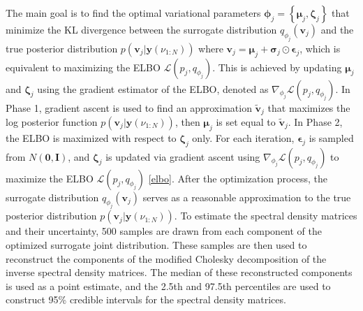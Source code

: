\documentclass[12pt,a4paper]{article}
\begin{document}
The main goal is to find the optimal variational parameters $\bm{\phi}_j = \left\{\bm{\mu}_j, \bm{\zeta}_j \right\}$ that minimize the KL divergence between the surrogate distribution $q_{\phi_j}(\mathbf{v}_j)$ and the true posterior distribution $p(\mathbf{v}_j|\mathbf{y}(\nu_{1:N}))$ where $\mathbf{v}_j = \bm{\mu}_j+ \bm{\sigma}_j \odot \bm{\epsilon}_j$, which is equivalent to maximizing the ELBO $\mathcal{L}(p_j,q_{\phi_j})$. This is achieved by updating $\bm{\mu}_j$ and $\bm{\zeta}_j$ using the gradient estimator of the ELBO, denoted as $\nabla_{\phi_j} \mathcal{L}(p_j,q_{\phi_j})$. In Phase 1, gradient ascent is used to find an approximation $\tilde{\mathbf{v}}_j$ that maximizes the log posterior function $p(\mathbf{v}_j|\mathbf{y}(\nu_{1:N}))$, then $\bm{\mu}_j$ is set equal to $\tilde{\mathbf{v}}_j$. In Phase 2, the ELBO is maximized with respect to $\bm{\zeta}_j$ only. For each iteration, $\bm{\epsilon}_j$ is sampled from $N(\bm{0}, \mathbf{I})$, and $\bm{\zeta}_j$ is updated via gradient ascent using $\nabla_{\phi_j} \mathcal{L}(p_j, q_{\phi_j})$ to maximize the ELBO $\mathcal{L}(p_j,q_{\phi_j})$ \eqref{elbo}. After the optimization process, the surrogate distribution $q_{\phi_j}(\mathbf{v}_j)$ serves as a reasonable approximation to the true posterior distribution $p(\mathbf{v}_j|\mathbf{y}(\nu_{1:N}))$. To estimate the spectral density matrices and their uncertainty, 500 samples are drawn from each component of the optimized surrogate joint distribution. These samples are then used to reconstruct the components of the modified Cholesky decomposition of the inverse spectral density matrices. The median of these reconstructed components is used as a point estimate, and the 2.5th and 97.5th percentiles are used to construct 95\% credible intervals for the spectral density matrices.
\end{document}
